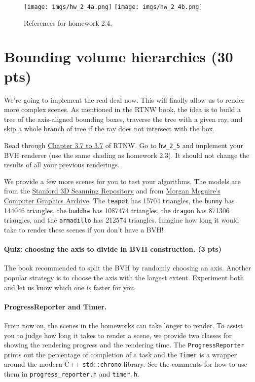 \begin{figure}[ht]
    \centering
    \texttt{[image: imgs/hw\_2\_4a.png]}
    \texttt{[image: imgs/hw\_2\_4b.png]}
    \caption{References for homework 2.4.}
    \label{fig:hw_2_4}
\end{figure}

\section{Bounding volume hierarchies (30 pts)}
We're going to implement the real deal now. This will finally allow us to render more complex scenes. As mentioned in the RTNW book, the idea is to build a tree of the axis-aligned bounding boxes, traverse the tree with a given ray, and skip a whole branch of tree if the ray does not intersect with the box. 

Read through \href{https://raytracing.github.io/books/RayTracingTheNextWeek.html#boundingvolumehierarchies/creatingboundingboxesoflistsofobjects}{Chapter 3.7 to 3.7} of RTNW. Go to \lstinline{hw_2_5} and implement your BVH renderer (use the same shading as homework 2.3). It should not change the results of all your previous renderings.

We provide a few more scenes for you to test your algorithms. The models are from the \href{https://graphics.stanford.edu/data/3Dscanrep/}{Stanford 3D Scanning Repository} and from \href{https://casual-effects.com/data/}{Morgan Mcguire's Computer Graphics Archive}. The \lstinline{teapot} has 15704 triangles, the \lstinline{bunny} has 144046 triangles, the \lstinline{buddha} has 1087474 triangles, the \lstinline{dragon} has 871306 triangles, and the \lstinline{armadillo} has 212574 triangles. Imagine how long it would take to render these scenes if you don't have a BVH!

\paragraph{Quiz: choosing the axis to divide in BVH construction. (3 pts)} The book recommended to split the BVH by randomly choosing an axis. Another popular strategy is to choose the axis with the largest extent. Experiment both and let us know which one is faster for you.

\paragraph{ProgressReporter and Timer.} From now on, the scenes in the homeworks can take longer to render. To assist you to judge how long it takes to render a scene, we provide two classes for showing the rendering progress and the rendering time. The \lstinline{ProgressReporter} prints out the percentage of completion of a task and the \lstinline{Timer} is a wrapper around the modern C++ \lstinline{std::chrono} library. See the comments for how to use them in \lstinline{progress_reporter.h} and \lstinline{timer.h}.

